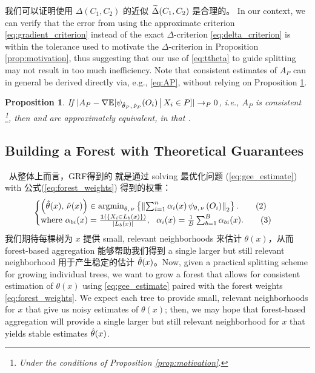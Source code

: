 \documentclass[aos]{imsart}
\theoremstyle{plain}
\newtheorem{prop}{Proposition}
\theoremstyle{definition}
\theoremstyle{remark}
\begin{document}
\begin{CJK}{UTF8}{gbsn}
我们可以证明使用 $\Delta(C_1, C_2)$ 的近似 $\widetilde{\Delta}(C_1, C_2)$ 是合理的。 In our context, we can verify that the error from using the approximate criterion \eqref{eq:gradient_criterion} instead of
the exact $\Delta$-criterion \eqref{eq:delta_criterion} is within the tolerance used
to motivate the $\Delta$-criterion in Proposition \ref{prop:motivation}, thus suggesting
that our use of \eqref{eq:ttheta} to guide splitting may not result in too much inefficiency.
Note that consistent estimates of $A_P$ can in general be derived directly via, e.g., \eqref{eq:AP},
without relying on Proposition \ref{prop:approximation}.

\begin{prop}
\label{prop:approximation} 
If $|A_P - \nabla \mathbb{E}[\psi_{\hat{\theta}_P, \, \hat{\nu}_P}(O_i) \,\big|\, X_i \in P]| \rightarrow_P 0$,
i.e., $A_P$ is consistent \footnote{Under the conditions of Proposition \ref{prop:motivation}.},
then  and  are approximately equivalent, in that
.
\end{prop}



\newpage

\subsection{Building a Forest with Theoretical Guarantees}
\label{sec:implementation}
\, 从整体上而言，GRF得到的  就是通过 solving 最优化问题 (\ref{eq:gee_estimate}) with 公式(\ref{eq:forest_weights}) 得到的权重：
\begin{equation*}
\begin{cases}
\p{\htheta(x), \, \hnu(x)} \in \argmin_{\theta, \, \nu} \cb{\Norm{\sum_{i = 1}^n \alpha_i(x) \, \psi_{\theta, \, \nu}\p{O_i}}_2}. \qquad (2) \\
\text{where } \alpha_{bi}(x) = \frac{\1\p{\cb{X_i \in L_b(x)}}}{\abs{L_b(x)}}, \ \ \alpha_i(x) = \frac{1}{B} \sum_{b = 1}^B \alpha_{bi}(x).  \qquad (3)
\end{cases}
\end{equation*}
我们期待每棵树为 $x$ 提供 small, relevant neighborhoods 来估计 $\theta(x)$，从而 forest-based aggregation 能够帮助我们得到 a single larger but still relevant neighborhood 用于产生稳定的估计 $\hat{\theta}(x)$。Now, given a practical splitting scheme for growing individual trees, we want to grow a forest that allows for consistent estimation of $\theta(x)$ using \eqref{eq:gee_estimate} paired with the forest weights \eqref{eq:forest_weights}. We expect each
tree to provide small, relevant neighborhoods for $x$ that give us noisy estimates of $\theta(x)$;
then, we may hope that forest-based aggregation will provide a single larger but still relevant neighborhood for $x$ that yields stable estimates $\hat{\theta}(x)$.


\end{CJK}
\end{document}
